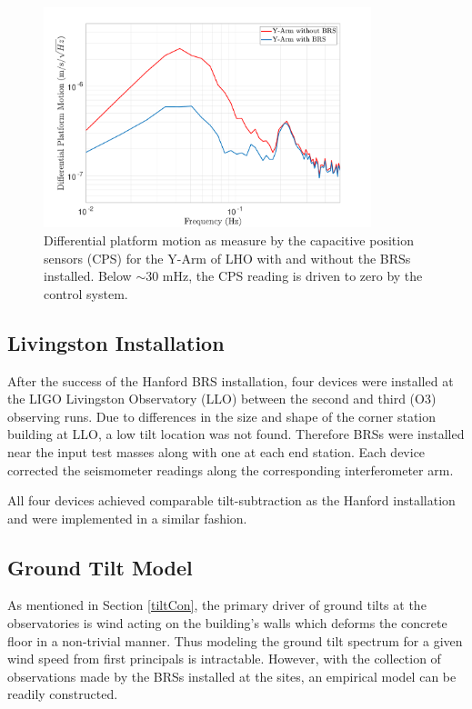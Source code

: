 \documentclass [12pt, proquest]{uwthesis}[2019]
\begin{document}
\begin{figure}[!h]
\begin{center}
\includegraphics[width=0.85\textwidth]{BRSArmMotion.pdf}
\caption[Differential platform motion ]{Differential platform motion as measure by the capacitive position sensors (CPS) for the Y-Arm of LHO with and without the BRSs installed. Below $\sim$30 mHz, the CPS reading is driven to zero by the control system.}
\label{armMotion}
\end{center}
\end{figure}

\subsection{Livingston Installation}

\quad After the success of the Hanford BRS installation, four devices were installed at the LIGO Livingston Observatory (LLO) between the second and third (O3) observing runs. Due to differences in the size and shape of the corner station building at LLO, a low tilt location was not found. Therefore BRSs were installed near the input test masses along with one at each end station. Each device corrected the seismometer readings along the corresponding interferometer arm. 

All four devices achieved comparable tilt-subtraction as the Hanford installation and were implemented in a similar fashion. 

\subsection{Ground Tilt Model}


As mentioned in Section \ref{tiltCon}, the primary driver of ground tilts at the observatories is wind acting on the building's walls which deforms the concrete floor in a non-trivial manner. Thus modeling the ground tilt spectrum for a given wind speed from first principals is intractable. However, with the collection of observations made by the BRSs installed at the sites, an empirical model can be readily constructed.
\end{document}
